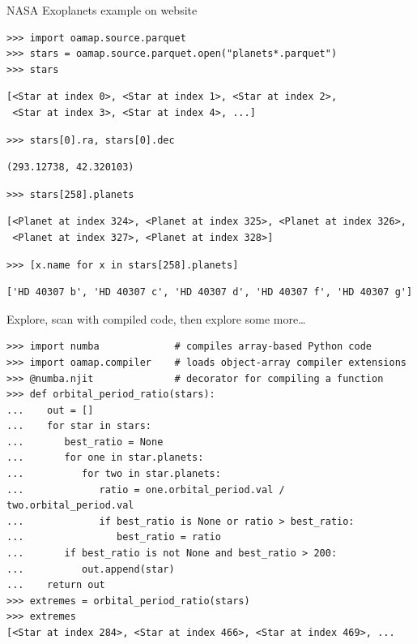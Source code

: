 \documentclass[aspectratio=169]{beamer}
\begin{document}
\begin{frame}[fragile]{NASA Exoplanets example on website}
\vspace{0.1 cm}
\small
\begin{verbatim}
>>> import oamap.source.parquet
>>> stars = oamap.source.parquet.open("planets*.parquet")
>>> stars
\end{verbatim}
\begin{verbatim}
[<Star at index 0>, <Star at index 1>, <Star at index 2>,
 <Star at index 3>, <Star at index 4>, ...]
\end{verbatim}
\begin{verbatim}
>>> stars[0].ra, stars[0].dec
\end{verbatim}
\begin{verbatim}
(293.12738, 42.320103)
\end{verbatim}
\begin{verbatim}
>>> stars[258].planets
\end{verbatim}
\begin{verbatim}
[<Planet at index 324>, <Planet at index 325>, <Planet at index 326>,
 <Planet at index 327>, <Planet at index 328>]
\end{verbatim}
\begin{verbatim}
>>> [x.name for x in stars[258].planets]
\end{verbatim}
\begin{verbatim}
['HD 40307 b', 'HD 40307 c', 'HD 40307 d', 'HD 40307 f', 'HD 40307 g']
\end{verbatim}
\end{frame}

\begin{frame}[fragile]{Explore, scan with compiled code, then explore some more\ldots}
\vspace{0.1 cm}
\small
\begin{verbatim}
>>> import numba             # compiles array-based Python code
>>> import oamap.compiler    # loads object-array compiler extensions
>>> @numba.njit              # decorator for compiling a function
>>> def orbital_period_ratio(stars):
...    out = []
...    for star in stars:
...       best_ratio = None
...       for one in star.planets:
...          for two in star.planets:
...             ratio = one.orbital_period.val / two.orbital_period.val
...             if best_ratio is None or ratio > best_ratio:
...                best_ratio = ratio
...       if best_ratio is not None and best_ratio > 200:
...          out.append(star)
...    return out
>>> extremes = orbital_period_ratio(stars)
>>> extremes
[<Star at index 284>, <Star at index 466>, <Star at index 469>, ...
\end{verbatim}
\end{frame}
\end{document}
